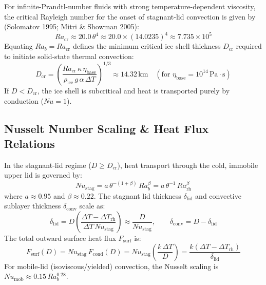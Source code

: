 \documentclass[11pt,a4paper]{article}
\begin{document}
For infinite-Prandtl-number fluids with strong temperature-dependent viscosity, the critical Rayleigh number for the onset of stagnant-lid convection is given by (Solomatov 1995; Mitri \& Showman 2005):
\begin{equation}
Ra_{\text{cr}} \approx 20.0 \, \theta^4 \approx 20.0 \times (14.0235)^4 \approx 7.735 \times 10^5
\label{eq:ra_cr}
\end{equation}
Equating $Ra_b = Ra_{\text{cr}}$ defines the minimum critical ice shell thickness $D_{\text{cr}}$ required to initiate solid-state thermal convection:
\begin{equation}
D_{\text{cr}} = \left( \frac{Ra_{\text{cr}} \, \kappa \, \eta_{\text{base}}}{\rho_{\text{ice}} \, g \, \alpha \, \Delta T} \right)^{1/3} \approx 14.32\,\text{km} \quad (\text{for } \eta_{\text{base}} = 10^{14}\,\text{Pa}\cdot\text{s})
\label{eq:d_cr}
\end{equation}
If $D < D_{\text{cr}}$, the ice shell is subcritical and heat is transported purely by conduction ($Nu = 1$).

\subsection{Nusselt Number Scaling \& Heat Flux Relations}
In the stagnant-lid regime ($D \ge D_{\text{cr}}$), heat transport through the cold, immobile upper lid is governed by:
\begin{equation}
Nu_{\text{stag}} = a \, \theta^{-(1+\beta)} \, Ra_b^\beta = a \, \theta^{-1} \, Ra_{\text{rh}}^\beta
\label{eq:nu_stag}
\end{equation}
where $a \approx 0.95$ and $\beta \approx 0.22$. The stagnant lid thickness $\delta_{\text{lid}}$ and convective sublayer thickness $\delta_{\text{conv}}$ scale as:
\begin{equation}
\delta_{\text{lid}} = D \left( \frac{\Delta T - \Delta T_{\text{rh}}}{\Delta T \, Nu_{\text{stag}}} \right) \approx \frac{D}{Nu_{\text{stag}}}, \qquad \delta_{\text{conv}} = D - \delta_{\text{lid}}
\label{eq:delta_lid}
\end{equation}
The total outward surface heat flux $F_{\text{surf}}$ is:
\begin{equation}
F_{\text{surf}}(D) = Nu_{\text{stag}} \, F_{\text{cond}}(D) = Nu_{\text{stag}} \left( \frac{k \, \Delta T}{D} \right) = \frac{k (\Delta T - \Delta T_{\text{rh}})}{\delta_{\text{lid}}}
\label{eq:f_surf}
\end{equation}
For mobile-lid (isoviscous/yielded) convection, the Nusselt scaling is $Nu_{\text{mob}} \approx 0.15 \, Ra_b^{0.28}$.
\end{document}
